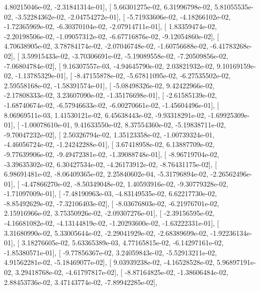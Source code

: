 \documentclass{article}
\begin{document}
          4.80215046e-02,  -2.31841314e-01],
       [  5.66301275e-02,   6.31996798e-02,   5.81055535e-02,
         -3.52284362e-02,  -2.04754272e-01],
       [ -5.71933606e-02,  -4.18266102e-02,  -1.72365969e-02,
         -6.30370104e-02,  -2.07914711e-01],
       [  1.83359474e-02,  -2.20198506e-02,  -1.09057312e-02,
         -6.67716876e-02,  -9.12054860e-02],
       [  4.70638905e-02,   3.78784174e-02,  -2.07046748e-02,
         -1.60756688e-02,  -6.41783268e-02],
       [  3.59915433e-02,  -3.70306691e-02,  -5.19089558e-02,
         -7.20509856e-02,  -7.06804784e-02],
       [  9.16307557e-03,  -4.94645790e-02,   2.03821932e-02,
          9.10169159e-02,  -1.13785329e-01],
       [ -8.47155878e-02,  -5.67811095e-02,  -6.27535502e-02,
          2.59558168e-02,  -1.58391574e-01],
       [ -5.08498326e-02,   9.42422966e-02,  -2.17808333e-02,
          3.23607090e-02,  -1.35176698e-01],
       [ -2.61585139e-02,  -1.68740674e-02,  -6.57946633e-02,
         -6.00270661e-02,  -1.45604496e-01],
       [  8.06969511e-03,   1.41530121e-02,   6.45638443e-02,
         -9.93318291e-02,  -1.69925309e-01],
       [ -1.00078610e-01,   9.41633550e-02,   8.37554360e-02,
         -5.19838711e-02,  -9.70047232e-02],
       [  2.50326794e-02,   1.35123358e-02,  -1.00739324e-01,
         -4.46056724e-02,  -1.24242288e-01],
       [  3.67418958e-02,   6.13887709e-02,  -9.77639906e-02,
         -9.49472381e-02,  -1.39088748e-01],
       [ -8.96719704e-02,  -3.39635302e-02,   6.30427534e-02,
         -4.26173912e-02,  -8.76431175e-02],
       [  6.98691481e-02,  -8.06409365e-02,   2.25840602e-04,
         -5.31796894e-02,  -2.26562496e-01],
       [ -4.47866270e-02,  -8.50349048e-02,   1.40593916e-02,
         -9.30779328e-02,  -1.71097009e-01],
       [ -7.48190963e-03,  -4.83149535e-02,   6.62217730e-02,
         -8.85492629e-02,  -7.32106403e-02],
       [ -8.03676803e-02,  -6.21976701e-02,   2.15916966e-02,
          3.75350926e-02,  -2.09307276e-01],
       [ -2.39156595e-02,  -4.16681082e-02,  -4.13144819e-02,
         -1.20293600e-02,  -1.63222331e-01],
       [  3.31680990e-02,   5.33005644e-02,  -2.29041929e-02,
         -2.68389699e-02,  -1.92236134e-01],
       [  3.18276605e-02,   5.63365389e-03,   4.77165815e-02,
         -6.14297161e-02,  -1.85380571e-01],
       [ -9.77856367e-02,   3.24059843e-02,  -5.52913211e-02,
          4.91562281e-02,  -5.18469077e-02],
       [  9.03939238e-02,  -4.16528528e-02,   5.96897191e-02,
          3.29418768e-02,  -4.61797817e-02],
       [ -8.87164825e-02,  -1.38606484e-02,   2.88453736e-02,
          3.47143774e-02,  -7.89942285e-02],
\end{document}
